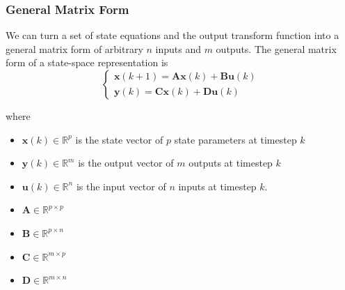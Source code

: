 \documentclass[11pt]{article}
\begin{document}
\subsubsection{General Matrix Form}
We can turn a set of state equations and the output transform function into a general matrix form of arbitrary $n$ inputs and $m$ outputs.
The general matrix form of a state-space representation is
\begin{equation}
  \begin{cases}
    \textbf{x} (k+1) = \textbf{A} \textbf{x} (k) + \textbf{B} \textbf{u} (k) \\
    \textbf{y}(k) = \textbf{C} \textbf{x} (k) + \textbf{D} \textbf{u} (k)
  \end{cases}
\end{equation}

where 
\begin{itemize}
  \item $\textbf{x}(k) \in \mathbb{R}^p$ is the state vector of $p$ state parameters at timestep $k$
  \item $\textbf{y}(k) \in \mathbb{R}^m$ is the output vector of $m$ outputs at timestep $k$
  \item $\textbf{u}(k) \in \mathbb{R}^n$ is the input vector of $n$ inputs at timestep $k$.
  \item $\textbf{A} \in \mathbb{R}^{p \times p}$
  \item $\textbf{B} \in \mathbb{R}^{p \times n}$
  \item $\textbf{C} \in \mathbb{R}^{m \times p}$
  \item $\textbf{D} \in \mathbb{R}^{m \times n}$
\end{itemize}
\end{document}
